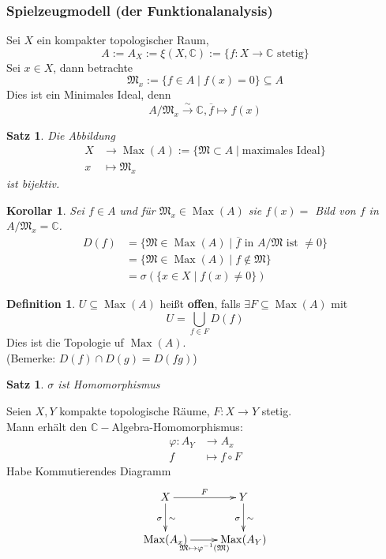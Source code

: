 \documentclass[10pt,a4paper]{article}
\newcommand{\C}{\ensuremath{\mathbb{C}}}
\newcommand{\ol}[1]{\overline{#1}}
\newcommand{\isomfunc}{\ensuremath{\xrightarrow{\sim}}}
\newcounter{thm}[section]
\let\oldsubsubsection\subsubsection
\renewcommand{\subsubsection}{\stepcounter{thm}\oldsubsubsection}
\theoremstyle{definition}
\newtheorem{definition}[thm]{Definition}
\theoremstyle{plain}
\newtheorem{kor}[thm]{Korollar}
\newtheorem{satz}[thm]{Satz}
\theoremstyle{remark}
\begin{document}
\subsubsection{Spielzeugmodell (der Funktionalanalysis)}
Sei $X$ ein kompakter topologischer Raum,
\[A:=A_X:=\xi (X,\C):=\{f:X\to \C\text{ stetig}\}\]
Sei $x\in X$, dann betrachte
\[\mathfrak M_x:=\{f\in A\mid f(x)=0\}\subseteq A\]
Dies ist ein Minimales Ideal, denn
\[A/\mathfrak M_x\isomfunc \C, \ol{f}\mapsto f(x)\]
\begin{satz}
	Die Abbildung 
\begin{align*}
	X&\rightarrow \operatorname{Max}(A):=\{\mathfrak M\subset A\mid \text{maximales Ideal}\}\\
	x&\mapsto\mathfrak M_x
\end{align*}
	ist bijektiv.
\end{satz}
\begin{kor}
	Sei $f\in A$ und für $\mathfrak M_x\in\operatorname{Max}(A)$ sie $f(x)=$ Bild von $f$ in $A/\mathfrak M_x=\C$.
	\begin{align*}
	D(f)&=\{\mathfrak M\in \operatorname{Max}(A)\mid \text{$\ol{f}$ in $A/\mathfrak M$ ist $\neq 0$}\}\\
	&=\{\mathfrak M\in\operatorname{Max}(A)\mid f\notin\mathfrak M\}\\
	&=\sigma(\{x\in X\mid f(x)\neq 0\})
	\end{align*}
\end{kor}
\begin{definition}
	$U\subseteq\operatorname{Max}(A)$ heißt \textbf{offen}, falls $\exists F\subseteq\operatorname{Max}(A)$ mit
	\[U=\bigcup_{f\in F}D(f)\]
	Dies ist die Topologie uf $\operatorname{Max}(A)$.\\
	(Bemerke: $D(f)\cap D(g)=D(fg)$)
\end{definition}
\begin{satz}
	$\sigma$ ist Homomorphismus
\end{satz}
Seien $X,Y$ kompakte topologische Räume, $F:X\rightarrow Y$ stetig.\\
Mann erhält den $\C-$Algebra-Homomorphismus:
\begin{align*}
\varphi:A_Y&\rightarrow A_x\\
f&\mapsto f\circ F
\end{align*}
Habe Kommutierendes Diagramm
\[\xymatrix{
	X\ar[r]^F\ar[d]_\sigma^\sim& Y\ar[d]_\sigma^\sim\\
	\operatorname{Max}(A_x)\ar[r]_{\vspace{0.5cm} \mathfrak M\mapsto\varphi^{-1}(\mathfrak M)}&\operatorname{Max}(A_Y)
	}\]
\end{document}
